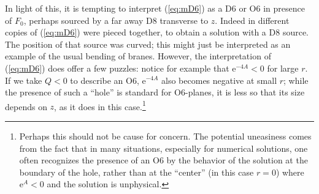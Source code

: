 \documentclass[12pt]{article}
\newcommand{\e}{\mathrm{e}}
\begin{document}
In light of this, it is tempting to interpret (\ref{eq:mD6}) as a D6 or O6 in presence of $F_0$, perhaps sourced by a far away D8 transverse to $z$. Indeed in \cite{imamura} different copies of (\ref{eq:mD6}) were pieced together, to obtain a solution with a D8 source. The position of that source was curved; this might just be interpreted as an example of the usual bending of branes. However, the interpretation of (\ref{eq:mD6}) does offer a few puzzles: notice for example that $\e^{-4A}<0$ for large $r$. If we take $Q<0$ to describe an O6, $\e^{-4A}$ also becomes negative at small $r$; while the presence of such a ``hole'' is standard for O6-planes, it is less so that its size depends on $z$, as it does in this case.\footnote{Perhaps this should not be cause for concern. The potential uneasiness comes from the fact that in many situations, especially for numerical solutions, one often recognizes the presence of an O6 by the behavior of the solution at the boundary of the hole, rather than at the ``center'' (in this case $r=0$) where $\e^A<0$ and the solution is unphysical.}
\end{document}
